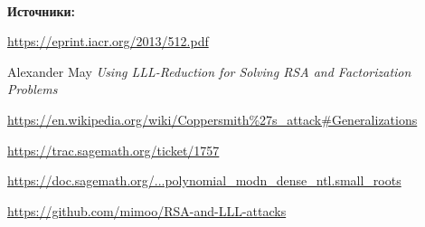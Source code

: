 \documentclass[12pt,a4paper]{scrartcl}
\begin{document}
\begin{center}
	\\
\end{center}

\textbf{Источники:}

\href{https://eprint.iacr.org/2013/512.pdf}{https://eprint.iacr.org/2013/512.pdf}

Alexander May \textit{Using LLL-Reduction for Solving RSA and Factorization Problems}

\href{https://en.wikipedia.org/wiki/Coppersmith%27s_attack#Generalizations}{https://en.wikipedia.org/wiki/Coppersmith\%27s\_attack\#Generalizations}
	
\href{https://trac.sagemath.org/ticket/1757}{https://trac.sagemath.org/ticket/1757}
	
\href{https://doc.sagemath.org/html/en/reference/polynomial_rings/sage/rings/polynomial/polynomial_modn_dense_ntl.html?highlight=small_roots#sage.rings.polynomial.polynomial_modn_dense_ntl.small_roots}{https://doc.sagemath.org/...polynomial\_modn\_dense\_ntl.small\_roots}
	
	
\href{https://github.com/mimoo/RSA-and-LLL-attacks}{https://github.com/mimoo/RSA-and-LLL-attacks}
\end{document}
